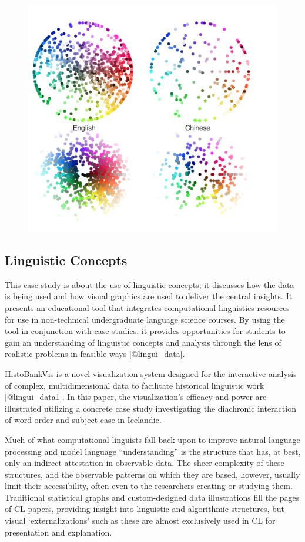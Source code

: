 \documentclass[]{book}
\theoremstyle{definition}
\theoremstyle{definition}
\theoremstyle{definition}
\theoremstyle{remark}
\begin{document}
\begin{figure}
\centering
\includegraphics{images/colorwords.png}
\caption{}
\end{figure}

\subsection{Linguistic Concepts}\label{linguistic-concepts}

This case study is about the use of linguistic concepts; it discusses
how the data is being used and how visual graphics are used to deliver
the central insights. It presents an educational tool that integrates
computational linguistics resources for use in non-technical
undergraduate language science courses. By using the tool in conjunction
with case studies, it provides opportunities for students to gain an
understanding of linguistic concepts and analysis through the lens of
realistic problems in feasible ways {[}@lingui\_data{]}.

HistoBankVis is a novel visualization system designed for the
interactive analysis of complex, multidimensional data to facilitate
historical linguistic work {[}@lingui\_data1{]}. In this paper, the
visualization's efficacy and power are illustrated utilizing a concrete
case study investigating the diachronic interaction of word order and
subject case in Icelandic.

Much of what computational linguists fall back upon to improve natural
language processing and model language ``understanding'' is the
structure that has, at best, only an indirect attestation in observable
data. The sheer complexity of these structures, and the observable
patterns on which they are based, however, usually limit their
accessibility, often even to the researchers creating or studying them.
Traditional statistical graphs and custom-designed data illustrations
fill the pages of CL papers, providing insight into linguistic and
algorithmic structures, but visual `externalizations' such as these are
almost exclusively used in CL for presentation and explanation.
\end{document}
